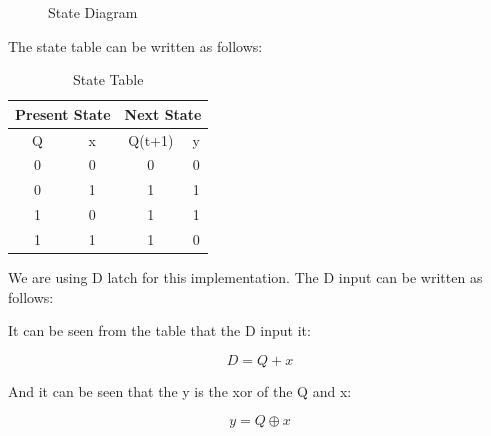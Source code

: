 \documentclass[table ]{article}
\begin{document}
\begin{figure}[H]
    \begin{center}
    \end{center}
    \caption{State Diagram}
\end{figure}


The state table can be written as follows:

\begin{table}[H]
    \centering
    \caption{State Table}
    \begin{tabular}{|c|c|c|c|}
        \hline
        \multicolumn{2}{|c|}{Present State} & \multicolumn{2}{c|}{Next State} \\
        \hline
        Q & x & Q(t+1) & y  \\
        \hline
        0 & 0 & 0 & 0 \\
        0 & 1 & 1 & 1 \\
        1 & 0 & 1 & 1 \\
        1 & 1 & 1 & 0 \\
        \hline
    \end{tabular}
\end{table}

We are using D latch for this implementation. The D input can be written as follows:

It can be seen from the table that the D input it:

\begin{equation}
    D = Q + x
\end{equation}

And it can be seen that the y is the xor of the Q and x:

\begin{equation}
    y = Q \oplus x
\end{equation}
\end{document}
